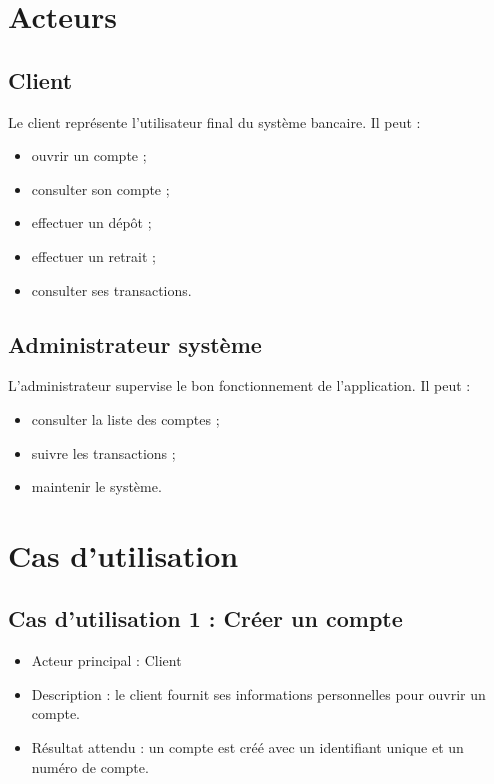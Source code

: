 \documentclass[12pt,a4paper]{article}
\begin{document}
\section{Acteurs}

\subsection{Client}

Le client représente l'utilisateur final du système bancaire. Il peut :

\begin{itemize}
    \item ouvrir un compte ;
    \item consulter son compte ;
    \item effectuer un dépôt ;
    \item effectuer un retrait ;
    \item consulter ses transactions.
\end{itemize}

\subsection{Administrateur système}

L'administrateur supervise le bon fonctionnement de l'application. Il peut :

\begin{itemize}
    \item consulter la liste des comptes ;
    \item suivre les transactions ;
    \item maintenir le système.
\end{itemize}

\section{Cas d'utilisation}

\subsection{Cas d'utilisation 1 : Créer un compte}

\begin{itemize}
    \item Acteur principal : Client
    \item Description : le client fournit ses informations personnelles pour ouvrir un compte.
    \item Résultat attendu : un compte est créé avec un identifiant unique et un numéro de compte.
\end{itemize}
\end{document}
